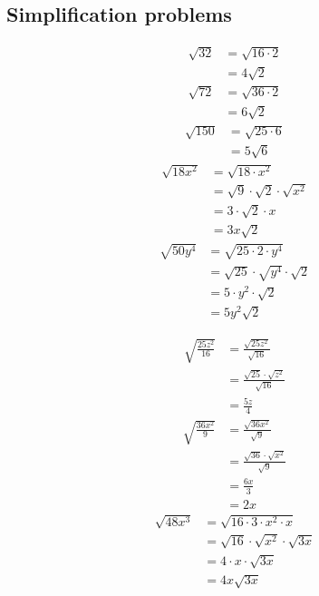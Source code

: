 \documentclass{hw}
\begin{document}
\subsection*{\normalsize Simplification problems}
\begin{minipage}{0.5\textwidth}
\centering
    \begin{align*}
        \sqrt{32} &= \sqrt{16 \cdot 2} \\
                    &= 4\sqrt{2}
    \end{align*}
    \begin{align*}
        \sqrt{72} &= \sqrt{36 \cdot 2} \\
                  &= 6\sqrt{2}
    \end{align*}
    \begin{align*}
        \sqrt{150}  &= \sqrt{25 \cdot 6} \\
                    &= 5\sqrt{6}
    \end{align*}
    \begin{align*}
        \sqrt{18x^2} &= \sqrt{18 \cdot x^2} \\
                     &= \sqrt{9} \cdot \sqrt{2} \cdot \sqrt{x^2} \\
                     &= 3 \cdot \sqrt{2} \cdot x \\
                     &= 3x\sqrt{2}
    \end{align*}
    \begin{align*}
        \sqrt{50y^4} &= \sqrt{25 \cdot 2 \cdot y^4} \\
                     &= \sqrt{25} \cdot \sqrt{y^4} \cdot \sqrt{2} \\
                     &= 5 \cdot y^2 \cdot \sqrt{2} \\
                     &= 5y^2\sqrt{2}
    \end{align*}
\end{minipage}
\begin{minipage}{0.5\textwidth}
\centering
    \begin{align*}
        \sqrt{\frac{25z^2}{16}} &= \frac{\sqrt{25z^2}}{\sqrt{16}} \\
                             &= \frac{\sqrt{25} \cdot \sqrt{z^2}}{\sqrt{16}} \\
                             &= \frac{5z}{4}
    \end{align*}
    \begin{align*}
        \sqrt{\frac{36x^2}{9}} &= \frac{\sqrt{36x^2}}{\sqrt{9}} \\
                        &= \frac{\sqrt{36} \cdot \sqrt{x^2}}{\sqrt{9}} \\
                        &= \frac{6x}{3} \\
                        &= 2x
    \end{align*}
    \begin{align*}
        \sqrt{48x^3} &= \sqrt{16 \cdot 3 \cdot x^2 \cdot x} \\
                      &= \sqrt{16} \cdot \sqrt{x^2} \cdot \sqrt{3x} \\
                      &= 4 \cdot x \cdot \sqrt{3x} \\
                      &= 4x\sqrt{3x}
    \end{align*}
\end{minipage}
\end{document}
